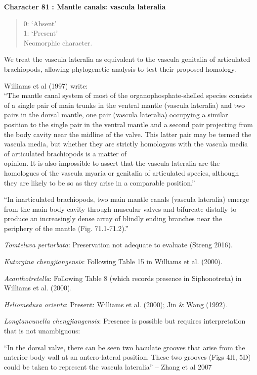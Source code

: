 \documentclass[]{book}
\theoremstyle{definition}
\theoremstyle{definition}
\theoremstyle{definition}
\theoremstyle{remark}
\begin{document}
\textbf{Character 81 : Mantle canals: vascula lateralia }

\begin{quote}
0: `Absent'\\
1: `Present'\\
Neomorphic character.
\end{quote}

We treat the vascula lateralia as equivalent to the vascula genitalia of
articulated brachiopods, allowing phylogenetic analysis to test their
proposed homology.

Williams et al (1997) write:\\
``The mantle canal system of most of the organophosphate-shelled species
consists of a single pair of main trunks in the ventral mantle (vascula
lateralia) and two pairs in the dorsal mantle, one pair (vascula
lateralia) occupying a similar position to the single pair in the
ventral mantle and a second pair projecting from the body cavity near
the midline of the valve. This latter pair may be termed the vascula
media, but whether they are strictly homologous with the vascula media
of articulated brachiopods is a matter of\\
opinion. It is also impossible to assert that the vascula lateralia are
the homologues of the vascula myaria or genitalia of articulated
species, although they are likely to be so as they arise in a comparable
position.''

``In inarticulated brachiopods, two main mantle canals (vascula
lateralia) emerge from the main body cavity through muscular valves and
bifurcate distally to produce an increasingly dense array of blindly
ending branches near the periphery of the mantle (Fig. 71.1-71.2).''

\emph{Tomteluva perturbata}: Preservation not adequate to evaluate
(Streng 2016).

\emph{Kutorgina chengjiangensis}: Following Table 15 in Williams et al.
(2000).

\emph{Acanthotretella}: Following Table 8 (which records presence in
Siphonotreta) in Williams et al. (2000).

\emph{Heliomedusa orienta}: Present: Williams et al. (2000); Jin \& Wang
(1992).

\emph{Longtancunella chengjiangensis}: Presence is possible but requires
interpretation that is not unambiguous:

``In the dorsal valve, there can be seen two baculate grooves that arise
from the\\
anterior body wall at an antero-lateral position. These two grooves
(Figs 4H, 5D) could be taken to represent the vascula lateralia'' --
Zhang et al 2007
\end{document}
